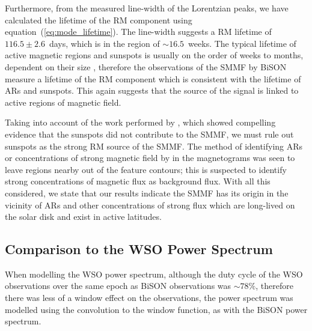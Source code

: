 Furthermore, from the measured line-width of the Lorentzian peaks, we have calculated the lifetime of the RM component using equation~(\ref{eq:mode_lifetime}). The line-width suggests a RM lifetime of $116.5 \pm 2.6$~days, which is in the region of $\sim 16.5$~weeks. The typical lifetime of active magnetic regions and sunspots is usually on the order of weeks to months, dependent on their size \citep{zwaan_solar_1981, schrijver_photospheric_1994, howard_sunspot_2001, hathaway_sunspot_2008, van_driel-gesztelyi_evolution_2015}, therefore the observations of the SMMF by BiSON measure a lifetime of the RM component which is consistent with the lifetime of ARs and sunspots. This again suggests that the source of the signal is linked to active regions of magnetic field.

Taking into account of the work performed by \citet{bose_variability_2018}, which showed compelling evidence that the sunspots did not contribute to the SMMF, we must rule out sunspots as the strong RM source of the SMMF. The method of identifying ARs or concentrations of strong magnetic field by \citet{bose_variability_2018} in the magnetograms was seen to leave regions nearby out of the feature contours; this is suspected to identify strong concentrations of magnetic flux as background flux. With all this considered, we state that our results indicate the SMMF has its origin in the vicinity of ARs and other concentrations of strong flux which are long-lived on the solar disk and exist in active latitudes.


\subsection{Comparison to the WSO Power Spectrum}\label{sec:WSO_reults}

When modelling the WSO power spectrum, although the duty cycle of the WSO observations over the same epoch as BiSON observations was $\sim 78\%$, therefore there was less of a window effect on the observations, the power spectrum was modelled using the convolution to the window function, as with the BiSON power spectrum.

%

